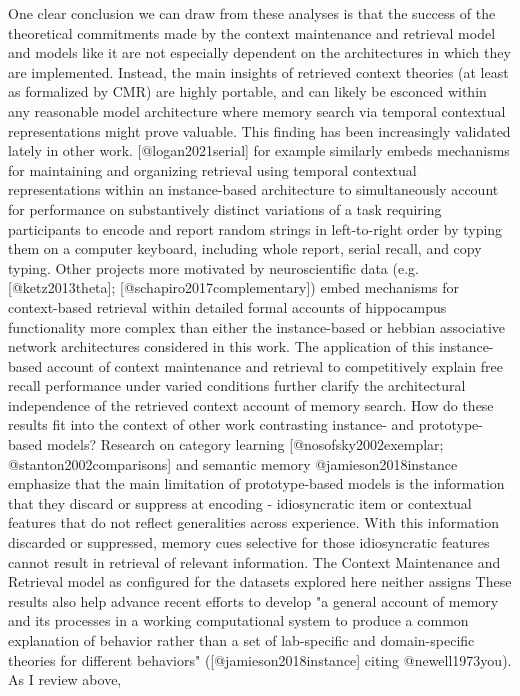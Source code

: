 One clear conclusion we can draw from these analyses is that the success of the theoretical commitments made by the context maintenance and retrieval model and models like it are not especially dependent on the architectures in which they are implemented. Instead, the main insights of retrieved context theories (at least as formalized by CMR) are highly portable, and can likely be esconced within any reasonable model architecture where memory search via temporal contextual representations might prove valuable. This finding has been increasingly validated lately in other work. [@logan2021serial] for example similarly embeds mechanisms for maintaining and organizing retrieval using temporal contextual representations within an instance-based architecture to simultaneously account for performance on substantively distinct variations of a task requiring participants to encode and report random strings in left-to-right order by typing them on a computer keyboard, including whole report, serial recall, and copy typing. Other projects more motivated by neuroscientific data (e.g. [@ketz2013theta]; [@schapiro2017complementary]) embed mechanisms for context-based retrieval within detailed formal accounts of hippocampus functionality more complex than either the instance-based or hebbian associative network architectures considered in this work. The application of this instance-based account of context maintenance and retrieval to competitively explain free recall performance under varied conditions further clarify the architectural independence of the retrieved context account of memory search.\markdownRendererInterblockSeparator
{}How do these results fit into the context of other work contrasting instance- and prototype-based models? Research on category learning [@nosofsky2002exemplar; @stanton2002comparisons] and semantic memory @jamieson2018instance emphasize that the main limitation of prototype-based models is the information that they discard or suppress at encoding - idiosyncratic item or contextual features that do not reflect generalities across experience. With this information discarded or suppressed, memory cues selective for those idiosyncratic features cannot result in retrieval of relevant information. The Context Maintenance and Retrieval model as configured for the datasets explored here neither assigns\markdownRendererInterblockSeparator
{}These results also help advance recent efforts to develop \markdownRendererBackslash{}"a general account of memory and its processes in a working computational system to produce a common explanation of behavior rather than a set of lab-specific and domain-specific theories for different behaviors\markdownRendererBackslash{}" ([@jamieson2018instance] citing @newell1973you). As I review above,\relax